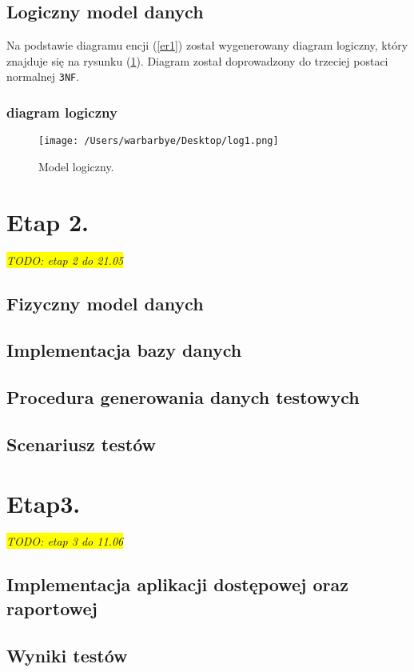 \documentclass{article}
\newcommand{\todo}[1]{
	\colorbox{yellow} {{\color{red}
	\emph {TODO: #1}
}}}
\begin{document}
\subsection{Logiczny model danych}
Na podstawie diagramu encji (\ref{er1}) został wygenerowany diagram logiczny, który znajduje się na rysunku (\ref{log1}). Diagram został doprowadzony do trzeciej postaci normalnej \texttt{3NF}.
\subsubsection{diagram logiczny}
\begin{figure}[H]
			\centering

			\texttt{[image: /Users/warbarbye/Desktop/log1.png]}
					\label{log1}
			\caption{Model logiczny.}
\end{figure}

\section{Etap 2. \label{s2}}
\todo{etap 2 do 21.05}
\subsection{Fizyczny model danych}
\subsection{Implementacja bazy danych}
\subsection{Procedura generowania danych testowych}
\subsection{Scenariusz testów}
\section{Etap3. \label{s3}}
\todo{etap 3 do 11.06}
\subsection{Implementacja aplikacji dostępowej oraz raportowej}
\subsection{Wyniki testów}
\end{document}
